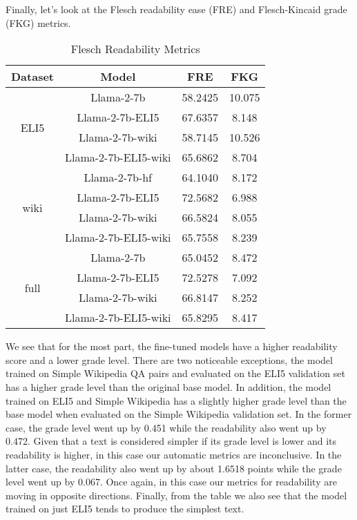\documentclass[11pt, oneside]{article}   	%
\begin{document}
Finally, let's look at the Flesch readability ease (FRE) and Flesch-Kincaid grade (FKG) metrics. 
\begin{table}[h]
\centering
\begin{tabular}{|c|c|c|c|}
\hline
\textbf{Dataset} & \textbf{Model} & \textbf{FRE} & \textbf{FKG} \\
\hline
\multirow{4}{*}{ELI5} & Llama-2-7b & 58.2425 & 10.075 \\
& Llama-2-7b-ELI5 & 67.6357 & 8.148  \\
& Llama-2-7b-wiki & 58.7145 & 10.526 \\
& Llama-2-7b-ELI5-wiki & 65.6862 &8.704  \\
\hline
\multirow{4}{*}{wiki} & Llama-2-7b-hf & 64.1040 & 8.172\\
& Llama-2-7b-ELI5 & 72.5682&6.988 \\
& Llama-2-7b-wiki & 66.5824 &8.055\\
& Llama-2-7b-ELI5-wiki & 65.7558 &8.239\\
\hline
\multirow{4}{*}{full} & Llama-2-7b & 65.0452&8.472 \\
& Llama-2-7b-ELI5 & 72.5278&7.092 \\
& Llama-2-7b-wiki & 66.8147&8.252 \\
& Llama-2-7b-ELI5-wiki & 65.8295 &8.417\\
\hline
\end{tabular}
\caption{Flesch Readability Metrics}
\end{table}
We see that for the most part, the fine-tuned models have a higher readability score and a lower grade level.
There are two noticeable exceptions, the model trained on Simple Wikipedia QA pairs and evaluated on the ELI5 validation set has a higher grade level than the original base model.
In addition, the model trained on ELI5 and Simple Wikipedia has a slightly higher grade level than the base model when evaluated on the Simple Wikipedia validation set. 
In the former case, the grade level went up by 0.451 while the readability also went up by 0.472.
Given that a text is considered simpler if its grade level is lower and its readability is higher, in this case our automatic metrics are inconclusive.
In the latter case, the readability also went up by about 1.6518 points while the grade level went up by 0.067.
Once again, in this case our metrics for readability are moving in opposite directions. 
Finally, from the table we also see that the model trained on just ELI5 tends to produce the simplest text. 



\end{document}
